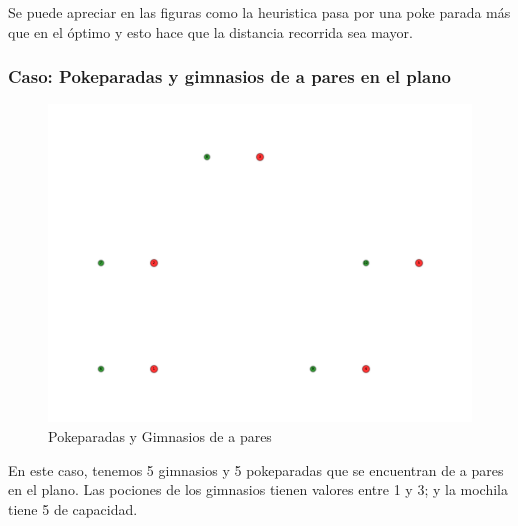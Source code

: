 Se puede apreciar en las figuras como la heuristica pasa por una poke parada más que en el óptimo y esto hace que la distancia recorrida sea mayor.


\subsubsection{Caso: Pokeparadas y gimnasios de a pares en el plano}

\begin{figure}[H]
  \begin{center}
    \includegraphics[scale=0.4]{imagenes/test2.pdf}
    \caption{Pokeparadas y Gimnasios de a pares}
    \label{fig:ej2_caso2}
  \end{center}
\end{figure}

En este caso, tenemos 5 gimnasios y 5 pokeparadas que se encuentran de a pares en el plano. Las pociones de los gimnasios tienen valores entre 1 y 3; y la mochila tiene 5 de capacidad.


